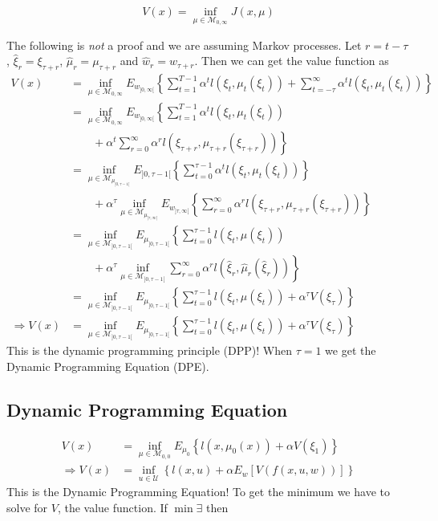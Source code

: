 \begin{equation*}
V(x) = \inf_{\mu\in\mathcal{M}_{0,\infty}} J(x,\mu)
\end{equation*}

The following is \textit{not} a proof and we are assuming Markov processes.
Let $r=t-\tau$, $\hat{\xi}_r=\xi_{\tau+r}$, $\hat{\mu}_r=\mu_{\tau+r}$ and $\hat{w}_r=w_{\tau+r}$.
Then we can get the value function as
\begin{align}
V(x) &= \inf_{\mu\in\mathcal{M}_{0,\infty}} E_{w_{]0,\infty[}} \left\lbrace \sum_{t=1}^{T-1} \alpha^t l(\xi_t,\mu_t(\xi_t)) + \sum_{t=-\tau}^\infty \alpha^t l(\xi_t,\mu_t(\xi_t))\right\rbrace \nonumber \\%
&= \inf_{\mu\in\mathcal{M}_{0,\infty}} E_{w_{]0,\infty[}} \left\lbrace \sum_{t=1}^{T-1} \alpha^t l(\xi_t,\mu_t(\xi_t)) \right. \nonumber \\%
&\left. \qquad +  \alpha^t \sum_{r=0}^\infty \alpha^r l(\xi_{\tau+r},\mu_{\tau+r}(\xi_{\tau+r})) \right\rbrace \nonumber \\
&= \inf_{\mu\in\mathcal{M}_{\mu_{]0,\tau-1[}}} E_{]0,\tau-1[} \left\lbrace \sum_{t=0}^{\tau-1} \alpha^t l(\xi_t,\mu_t(\xi_t))\right\rbrace \nonumber \\%
&\qquad + \alpha^\tau\inf_{\mu\in\mathcal{M}_{\mu_{]\tau,\infty[}}} E_{w_{]\tau,\infty[}} \left\lbrace \sum_{r=0}^\infty\alpha^r l(\xi_{\tau+r},\mu_{\tau+r}(\xi_{\tau+r}))\right\rbrace \nonumber \\%
&= \inf_{\mu\in\mathcal{M}_{]0,\tau-1[}} E_{\mu_{]0,\tau-1[}} \left\lbrace \sum_{t=0}^{\tau-1} l(\xi_t,\mu(\xi_t)) \right. \nonumber \\%
&\left. \qquad + \alpha^\tau \inf_{\mu\in\mathcal{M}_{]0,\tau-1[}} \sum_{r=0}^\infty \alpha^r l(\hat{\xi}_r,\hat{\mu}_r(\hat{\xi}_r)) \right\rbrace \nonumber \\%
&= \inf_{\mu\in\mathcal{M}_{]0,\tau-1[}} E_{\mu_{]0,\tau-1[}} \left\lbrace \sum_{t=0}^{\tau-1} l(\xi_t,\mu(\xi_t)) + \alpha^\tau V(\xi_\tau) \right\rbrace \nonumber \nonumber \\%
\Rightarrow V(x) &= \inf_{\mu\in\mathcal{M}_{]0,\tau-1[}} E_{\mu_{]0,\tau-1[}} \left\lbrace \sum_{t=0}^{\tau-1} l(\xi_t,\mu(\xi_t)) + \alpha^\tau V(\xi_\tau) \right\rbrace%
\end{align}
This is the dynamic programming principle (DPP)! When $\tau=1$ we get the Dynamic Programming Equation (DPE).

\subsection{Dynamic Programming Equation}
\begin{align}
V(x) &= \inf_{\mu\in\mathcal{M}_{0,0}} E_{\mu_0} \left\lbrace l(x,\mu_0(x)) + \alpha V(\xi_1) \right\rbrace \nonumber \\
\Rightarrow V(x) &= \inf_{u\in\mathcal{U}} \left\lbrace l(x,u) + \alpha E_w[V(f(x,u,w))] \right\rbrace
\end{align}
This is the Dynamic Programming Equation! To get the minimum we have to solve for $V$, the value function.
If $\min\exists$ then

